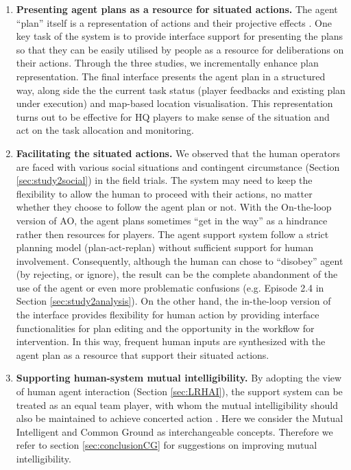 \begin{enumerate}
\item \textbf{Presenting agent plans as a resource for situated actions.} The agent ``plan'' itself is a representation of actions and their projective effects \cite{Suchman1987}. One key task of the system is to provide interface support for presenting the plans so that they can be easily utilised by people as a resource for deliberations on their actions. Through the three studies, we incrementally enhance plan representation. The final interface presents the agent plan in a structured way,  along side the the current task status (player feedbacks and existing plan under execution) and map-based location visualisation. This representation turns out to be effective for HQ players to make sense of the situation and act on the task allocation and monitoring.\\

\item \textbf{Facilitating the situated actions.} We observed that the human operators are faced with various social situations and contingent circumstance (Section \ref{sec:study2social}) in the field trials. The system may need to keep the flexibility to allow the human to proceed with their actions, no matter whether they choose to follow the agent plan or not. With the On-the-loop version of \ac{AO}, the agent plans sometimes ``get in the way'' as a hindrance rather then resources for players. The agent support system follow a strict planning model (plan-act-replan) without sufficient support for human involvement. Consequently, although the human can chose to ``disobey'' agent (by rejecting, or ignore), the result can be the complete abandonment of the use of the agent or even more problematic confusions (e.g. Episode 2.4 in Section \ref{sec:study2analysis}). On the other hand, the in-the-loop version of the interface provides flexibility for human action by providing interface functionalities for plan editing and the opportunity in the workflow for intervention. In this way, frequent human inputs are synthesized with the agent plan as a resource that support their situated actions. \\

\item \textbf{Supporting human-system mutual intelligibility.} By adopting the view of human agent interaction (Section \ref{sec:LRHAI}), the support system can be treated as an equal team player, with whom the mutual intelligibility should also be maintained to achieve concerted action \cite{Suchman1987}. Here we consider the Mutual Intelligent and Common Ground as interchangeable concepts.  Therefore we refer to section \ref{sec:conclusionCG} for suggestions on improving mutual intelligibility. \\
\end{enumerate}

